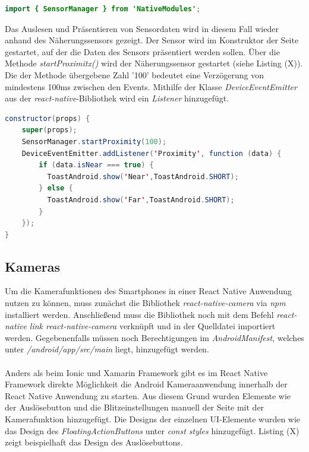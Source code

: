 \begin{lstlisting}[caption=Import der \textit{SensorManager}-Klasse, label=lst:ImportSensorManager, language=Java]
import { SensorManager } from 'NativeModules';
\end{lstlisting}

Das Auslesen und Präsentieren von Sensordaten wird in diesem Fall wieder anhand des Näherungssensors gezeigt. Der Sensor wird im Konstruktor der Seite gestartet, auf der die Daten des Sensors präsentiert werden sollen. Über die Methode \textit{startProximitx()} wird der Näherungssensor gestartet (siehe Listing (X)). Die der Methode übergebene Zahl '100' bedeutet eine Verzögerung von mindestens 100ms zwischen den Events. Mithilfe der Klasse \textit{DeviceEventEmitter} aus der \textit{react-native}-Bibliothek wird ein \textit{Listener} hinzugefügt. 
\clearpage

\begin{lstlisting}[caption=Auslesen und Anzeigen der Daten des Näherungssensors, label=lst:ProximityData, language=Java]
constructor(props) {
    super(props);
    SensorManager.startProximity(100);
    DeviceEventEmitter.addListener('Proximity', function (data) {
        if (data.isNear === true) {
          ToastAndroid.show('Near',ToastAndroid.SHORT);
        } else {
          ToastAndroid.show('Far',ToastAndroid.SHORT);
        }
    });
}
\end{lstlisting}

\subsection{Kameras}

Um die Kamerafunktionen des Smartphones in einer React Native Anwendung nutzen zu können, muss zunächst die Bibliothek \textit{react-native-camera} via \textit{npm} installiert werden. Anschließend muss die Bibliothek noch mit dem Befehl \textit{react-native link react-native-camera} verknüpft und in der Quelldatei importiert werden. Gegebenenfalls müssen noch Berechtigungen im \textit{AndroidManifest}, welches unter \textit{/android/app/src/main} liegt, hinzugefügt werden. 
\\
\\
Anders als beim Ionic und Xamarin Framework gibt es im React Native Framework direkte Möglichkeit die Android Kameraanwendung innerhalb der React Native Anwendung zu starten. Aus diesem Grund wurden Elemente wie der Auslösebutton und die Blitzeinstellungen manuell der Seite mit der Kamerafunktion hinzugefügt. Die Designs der einzelnen UI-Elemente wurden wie das Design des \textit{FloatingActionButtons} unter \textit{const styles} hinzugefügt. Listing (X) zeigt beispielhaft das Design des Auslösebuttons.

